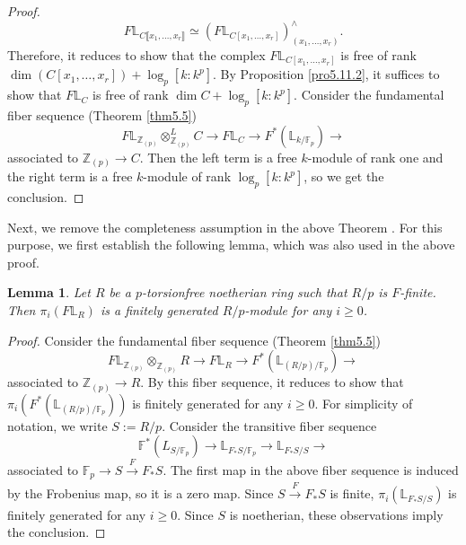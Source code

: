 \documentclass[11pt, a4paper]{amsart}
\theoremstyle{plain}
\newtheorem{lemma}[theorem]{Lemma}
\theoremstyle{definition}
\begin{document}
\begin{proof}
\[F\mathbb L_{C\llbracket x_1,\dots,x_r\rrbracket}\simeq (F\mathbb L_{C[x_1,\dots,x_r]})_{(x_1,\dots,x_r)}^{\wedge}.\] Therefore, it reduces to show that the complex $F\mathbb L_{C[x_1,\dots,x_r]}$ is free of rank $\operatorname{dim}(C[x_1,\dots,x_r])+\operatorname{log}_p[k:k^p]$. By Proposition \ref{pro5.11.2}, it suffices to show that $F\mathbb L_C$ is free of rank $\operatorname{dim}C+\operatorname{log}_p[k:k^p]$. Consider the fundamental fiber sequence (Theorem \ref{thm5.5})
\[F\mathbb L_{\mathbb Z_{(p)}}\otimes^L_{\mathbb Z_{(p)}}C\to F\mathbb L_C\to F^*(\mathbb L_{k/\mathbb F_p})\to\] 
associated to $\mathbb Z_{(p)}\to C$. Then the left term is a free $k$-module of rank one and the right term is a free $k$-module of rank $\operatorname{log}_p[k:k^p]$, so we get the conclusion.
\end{proof}


Next, we remove the completeness assumption in the above Theorem . For this purpose, we first establish the following lemma, which was also used in the above proof.
\begin{lemma}\label{lem6.15}
    Let $R$ be a $p$-torsionfree noetherian ring such that $R/p$ is $F$-finite. Then $\pi_i(F\mathbb L_R)$ is a finitely generated $R/p$-module for any $i\ge0$.
\end{lemma}
\begin{proof}
    Consider the fundamental fiber sequence (Theorem \ref{thm5.5})
    \[F\mathbb L_{\mathbb Z_{(p)}}\otimes_{\mathbb Z_{(p)}}R\to F\mathbb L_R\to F^*(\mathbb L_{(R/p)/\mathbb F_p})\to \] associated to $\mathbb Z_{(p)}\to R$. By this fiber sequence, it reduces to show that $\pi_i(F^*(\mathbb L_{(R/p)/\mathbb F_p}))$ is finitely generated for any $i\ge0$. For simplicity of notation, we write $S:=R/p$. Consider the transitive fiber sequence
    \[\mathbb F^*(L_{S/\mathbb F_p})\to \mathbb L_{F_*S/\mathbb F_p}\to \mathbb L_{F_*S/S}\to\]
    associated to $\mathbb F_p\to S\xrightarrow[]{F}F_*S$. The first map in the above fiber sequence is induced by the Frobenius map, so it is a zero map. Since $S\xrightarrow[]{F} F_*S$ is finite, $\pi_i(\mathbb L_{F_*S/S})$ is finitely generated for any $i\ge0$. Since $S$ is noetherian, these observations imply the conclusion.
\end{proof}
\end{document}
